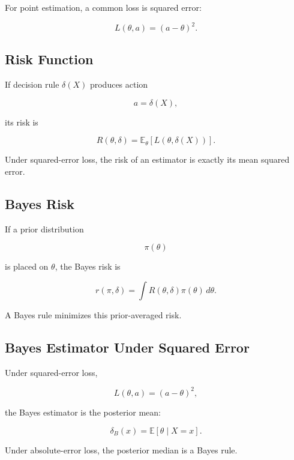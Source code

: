 For point estimation, a common loss is squared error:

\[
\boxed{
L
(
\theta,a
)
=
(a-\theta)^2.
}
\]

\subsection{Risk Function}
\label{subsec:risk-function}

If decision rule \(\delta(X)\) produces action

\[
a=\delta(X),
\]

its risk is

\[
\boxed{
R
(
\theta,\delta
)
=
\mathbb{E}_\theta
[
L
(
\theta,\delta(X)
)
].
}
\]

Under squared-error loss, the risk of an estimator is exactly its mean
squared error.

\subsection{Bayes Risk}
\label{subsec:bayes-risk}

If a prior distribution

\[
\pi(\theta)
\]

is placed on \(\theta\), the Bayes risk is

\[
\boxed{
r
(
\pi,\delta
)
=
\int
R
(
\theta,\delta
)
\pi(\theta)\,d\theta.
}
\]

A Bayes rule minimizes this prior-averaged risk.

\subsection{Bayes Estimator Under Squared Error}
\label{subsec:bayes-estimator-squared-error}

Under squared-error loss,

\[
L(\theta,a)
=
(a-\theta)^2,
\]

the Bayes estimator is the posterior mean:

\[
\boxed{
\delta_B(x)
=
\mathbb{E}
[
\theta\mid X=x
].
}
\]

Under absolute-error loss, the posterior median is a Bayes rule.

